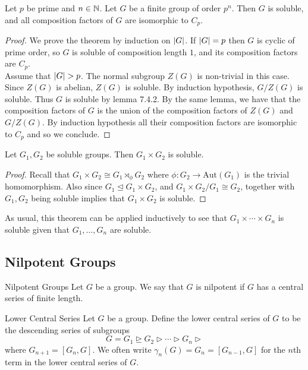 \documentclass[a4paper]{article}
\begin{document}
\begin{thm}{}{} Let $p$ be prime and $n\in\mathbb{N}$. Let $G$ be a finite group of order $p^n$. Then $G$ is soluble, and all composition factors of $G$ are isomorphic to $C_p$. 
\begin{proof}
We prove the theorem by induction on $\abs{G}$. If $\abs{G}=p$ then $G$ is cyclic of prime order, so $G$ is soluble of composition length $1$, and its composition factors are $C_p$. \\

Assume that $\abs{G}>p$. The normal subgroup $Z(G)$ is non-trivial in this case. Since $Z(G)$ is abelian, $Z(G)$ is soluble. By induction hypothesis, $G/Z(G)$ is soluble. Thus $G$ is soluble by lemma 7.4.2. By the same lemma, we have that the composition factors of $G$ is the union of the composition factors of $Z(G)$ and $G/Z(G)$. By induction hypothesis all their composition factors are isomorphic to $C_p$ and so we conclude. 
\end{proof}
\end{thm}

\begin{thm}{}{} Let $G_1,G_2$ be soluble groups. Then $G_1\times G_2$ is soluble. 
\begin{proof}
Recall that $G_1\times G_2\cong G_1\rtimes_\phi G_2$ where $\phi:G_2\to\text{Aut}(G_1)$ is the trivial homomorphism. Also since $G_1\trianglelefteq G_1\times G_2$, and $G_1\times G_2/G_1\cong G_2$, together with $G_1,G_2$ being soluble implies that $G_1\times G_2$ is soluble. 
\end{proof}
\end{thm}

As usual, this theorem can be applied inductively to see that $G_1\times\cdots\times G_n$ is soluble given that $G_1,\dots,G_n$ are soluble. 


\subsection{Nilpotent Groups}
\begin{defn}{Nilpotent Groups}{} Let $G$ be a group. We say that $G$ is nilpotent if $G$ has a central series of finite length. 
\end{defn}

\begin{defn}{Lower Central Series}{} Let $G$ be a group. Define the lower central series of $G$ to be the descending series of subgroups $$G=G_1\trianglerighteq G_2\triangleright\cdots\triangleright G_n\triangleright$$ where $G_{n+1}=[G_n,G]$. We often write $\gamma_n(G)=G_n=[G_{n-1},G]$ for the $n$th term in the lower central series of $G$. 
\end{defn}
\end{document}
